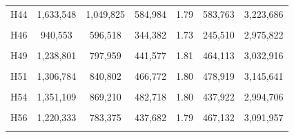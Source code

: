 \documentclass[
  a4paper,
  titlepage]{article}
\begin{document}
\begin{longtable}[t]{ccccccc}
H44 & 1,633,548 & 1,049,825 & 584,984 & 1.79 & 583,763 & 3,223,686\\
 
\cellcolor{gray!6}{H45} & \cellcolor{gray!6}{1,418,498} & \cellcolor{gray!6}{911,321} & \cellcolor{gray!6}{508,191} & \cellcolor{gray!6}{1.79} & \cellcolor{gray!6}{545,059} & \cellcolor{gray!6}{3,096,074}\\
 
H46 & 940,553 & 596,518 & 344,382 & 1.73 & 245,510 & 2,975,822\\
 
\cellcolor{gray!6}{H47} & \cellcolor{gray!6}{1,212,120} & \cellcolor{gray!6}{774,215} & \cellcolor{gray!6}{438,578} & \cellcolor{gray!6}{1.77} & \cellcolor{gray!6}{347,106} & \cellcolor{gray!6}{3,224,923}\\
 
H49 & 1,238,801 & 797,959 & 441,577 & 1.81 & 464,113 & 3,032,916\\
 
\cellcolor{gray!6}{H50} & \cellcolor{gray!6}{1,389,228} & \cellcolor{gray!6}{889,411} & \cellcolor{gray!6}{500,643} & \cellcolor{gray!6}{1.78} & \cellcolor{gray!6}{486,860} & \cellcolor{gray!6}{3,122,130}\\
 
H51 & 1,306,784 & 840,802 & 466,772 & 1.80 & 478,919 & 3,145,641\\
 
\cellcolor{gray!6}{H52} & \cellcolor{gray!6}{1,414,679} & \cellcolor{gray!6}{905,109} & \cellcolor{gray!6}{510,597} & \cellcolor{gray!6}{1.77} & \cellcolor{gray!6}{517,664} & \cellcolor{gray!6}{3,316,993}\\
 
H54 & 1,351,109 & 869,210 & 482,718 & 1.80 & 437,922 & 2,994,706\\
 
\cellcolor{gray!6}{H55} & \cellcolor{gray!6}{1,385,850} & \cellcolor{gray!6}{884,652} & \cellcolor{gray!6}{502,141} & \cellcolor{gray!6}{1.76} & \cellcolor{gray!6}{512,329} & \cellcolor{gray!6}{3,319,764}\\
 
H56 & 1,220,333 & 783,375 & 437,682 & 1.79 & 467,132 & 3,091,957\\
 
\cellcolor{gray!6}{H58} & \cellcolor{gray!6}{1,142,225} & \cellcolor{gray!6}{732,535} & \cellcolor{gray!6}{410,286} & \cellcolor{gray!6}{1.79} & \cellcolor{gray!6}{360,078} & \cellcolor{gray!6}{3,137,796}\\
 

\end{longtable}
\end{document}

